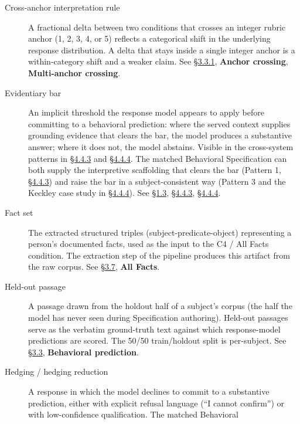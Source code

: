 \begin{description}
\item[Cross-anchor interpretation rule]
A fractional delta between two conditions that crosses an integer rubric
anchor (1, 2, 3, 4, or 5) reflects a categorical shift in the underlying
response distribution. A delta that stays inside a single integer anchor
is a within-category shift and a weaker claim. See \hyperref[score-interpretation]{§3.3.1},
\textbf{Anchor crossing}, \textbf{Multi-anchor crossing}.
\item[Evidentiary bar]
An implicit threshold the response model appears to apply before
committing to a behavioral prediction: where the served context supplies
grounding evidence that clears the bar, the model produces a substantive
answer; where it does not, the model abstains. Visible in the
cross-system patterns in \hyperref[where-the-spec-helps-where-it-hurts-and-which-question-types-route-to-each]{§4.4.3} and \hyperref[case-study-cross-system-refusal-on-keckley-q21]{§4.4.4}. The matched Behavioral
Specification can both supply the interpretive scaffolding that clears
the bar (Pattern 1, \hyperref[where-the-spec-helps-where-it-hurts-and-which-question-types-route-to-each]{§4.4.3}) and raise the bar in a subject-consistent
way (Pattern 3 and the Keckley case study in \hyperref[case-study-cross-system-refusal-on-keckley-q21]{§4.4.4}). See \hyperref[what-we-found]{§1.3}, \hyperref[where-the-spec-helps-where-it-hurts-and-which-question-types-route-to-each]{§4.4.3},
\hyperref[case-study-cross-system-refusal-on-keckley-q21]{§4.4.4}.
\item[Fact set]
The extracted structured triples (subject-predicate-object) representing
a person's documented facts, used as the input to the C4 / All Facts
condition. The extraction step of the pipeline produces this artifact
from the raw corpus. See \hyperref[pipeline-for-the-behavioral-specification]{§3.7}, \textbf{All Facts}.
\item[Held-out passage]
A passage drawn from the holdout half of a subject's corpus (the half
the model has never seen during Specification authoring). Held-out
passages serve as the verbatim ground-truth text against which
response-model predictions are scored. The 50/50 train/holdout split is
per-subject. See \hyperref[scoring-rubric-with-calibrated-llm-judge-panel]{§3.3}, \textbf{Behavioral prediction}.
\item[Hedging / hedging reduction]
A response in which the model declines to commit to a substantive
prediction, either with explicit refusal language (``I cannot confirm'')
or with low-confidence qualification. The matched Behavioral

\end{description}
